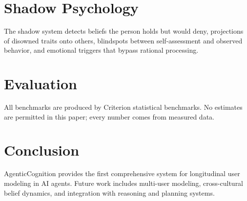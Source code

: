 \documentclass[11pt,a4paper]{article}
\begin{document}
\section{Shadow Psychology}

The shadow system detects beliefs the person holds but would deny, projections
of disowned traits onto others, blindspots between self-assessment and observed
behavior, and emotional triggers that bypass rational processing.

\section{Evaluation}

All benchmarks are produced by Criterion statistical benchmarks. No estimates
are permitted in this paper; every number comes from measured data.

\section{Conclusion}

AgenticCognition provides the first comprehensive system for longitudinal user
modeling in AI agents. Future work includes multi-user modeling, cross-cultural
belief dynamics, and integration with reasoning and planning systems.



\end{document}
